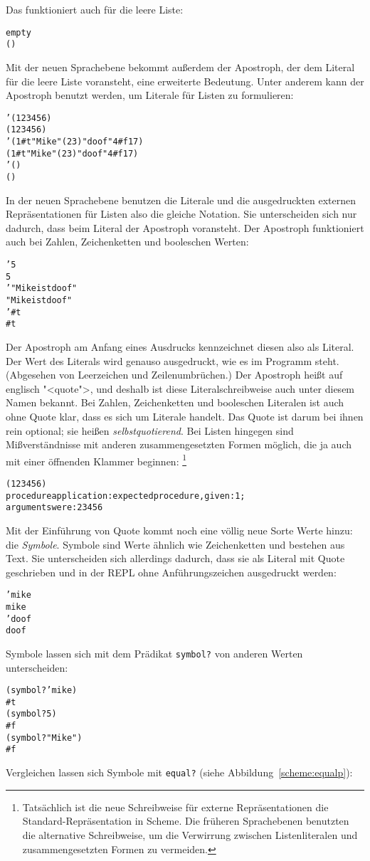 Das funktioniert auch für die leere Liste:
%
\begin{alltt}
empty
\evalsto{} ()
\end{alltt}
%
Mit der neuen Sprachebene bekommt außerdem der Apostroph, der dem
Literal für die leere Liste voransteht, eine erweiterte Bedeutung.
Unter anderem kann der Apostroph benutzt werden, um Literale für
Listen zu formulieren:
%
\begin{alltt}
'(1 2 3 4 5 6)
\evalsto{} (1 2 3 4 5 6)
'(1 #t "Mike" (2 3) "doof" 4 #f 17)
\evalsto{} (1 #t "Mike" (2 3) "doof" 4 #f 17)
'()
\evalsto{} ()
\end{alltt}
%
In der neuen Sprachebene benutzen die Literale und die ausgedruckten
externen Repräsentationen für Listen also die gleiche
Notation.  Sie unterscheiden sich nur dadurch,
dass beim Literal der Apostroph voransteht.  Der Apostroph funktioniert
auch bei Zahlen, Zeichenketten und booleschen Werten:
%
\begin{alltt}
'5
\evalsto{} 5
'"Mike ist doof"
\evalsto{} "Mike ist doof"
'#t
\evalsto{} #t
\end{alltt}
%
Der Apostroph am Anfang eines Ausdrucks
kennzeichnet diesen also als Literal.  Der Wert des Literals wird 
genauso ausgedruckt, wie es im Programm steht.  (Abgesehen von
Leerzeichen und Zeilenumbrüchen.)  Der Apostroph heißt auf englisch
"<quote">, und deshalb ist diese
Literalschreibweise auch unter diesem Namen bekannt.  Bei Zahlen,
Zeichenketten und booleschen Literalen ist auch ohne Quote klar, dass
es sich um Literale handelt.  Das Quote ist darum bei ihnen rein
optional; sie heißen 
\textit{selbstquotierend}.
Bei Listen hingegen sind Mißverständnisse mit anderen
zusammengesetzten Formen möglich, die ja auch mit einer öffnenden Klammer
beginnen: \footnote{Tatsächlich ist die neue Schreibweise für externe
  Repräsentationen die Standard-Repräsentation in Scheme.  Die
  früheren Sprachebenen benutzten die alternative Schreibweise, um die
  Verwirrung zwischen Listenliteralen und zusammengesetzten Formen zu
  vermeiden.}
\begin{alltt}
(1 2 3 4 5 6)
\evalsto{} procedure application: expected procedure, given: 1;
     arguments were: 2 3 4 5 6
\end{alltt}
%
Mit der Einführung von Quote kommt noch eine völlig neue Sorte Werte
hinzu: die \textit{Symbole}.  Symbole sind Werte ähnlich wie Zeichenketten und
bestehen aus Text.  Sie unterscheiden sich allerdings dadurch, dass sie
als Literal mit Quote geschrieben und in der REPL ohne
Anführungszeichen ausgedruckt werden:
%
\begin{alltt}
'mike
\evalsto{} mike
'doof
\evalsto{} doof
\end{alltt}
%
Symbole lassen sich mit dem Prädikat
\texttt{symbol?} von anderen Werten
unterscheiden:
%
\begin{alltt}
(symbol? 'mike)
\evalsto{} #t
(symbol? 5)
\evalsto{} #f
(symbol? "Mike")
\evalsto{} #f
\end{alltt}
%
Vergleichen lassen sich Symbole mit \texttt{equal?} (siehe
Abbildung~\ref{scheme:equalp}):


